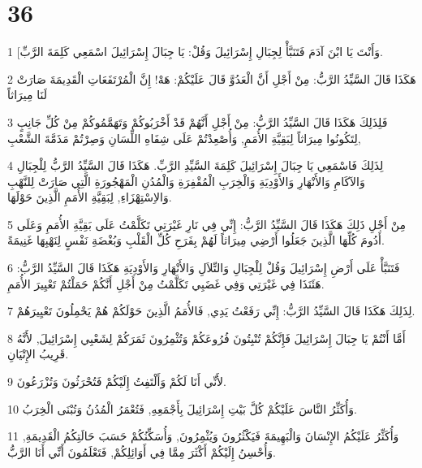 \chapter{36}

\par 1 [وَأَنْتَ يَا ابْنَ آدَمَ فَتَنَبَّأْ لِجِبَالِ إِسْرَائِيلَ وَقُلْ: يَا جِبَالَ إِسْرَائِيلَ اسْمَعِي كَلِمَةَ الرَّبِّ.
\par 2 هَكَذَا قَالَ السَّيِّدُ الرَّبُّ: مِنْ أَجْلِ أَنَّ الْعَدُوَّ قَالَ عَلَيْكُمْ: هَهْ! إِنَّ الْمُرْتَفَعَاتِ الْقَدِيمَةَ صَارَتْ لَنَا مِيرَاثاً
\par 3 فَلِذَلِكَ هَكَذَا قَالَ السَّيِّدُ الرَّبُّ: مِنْ أَجْلِ أَنَّهُمْ قَدْ أَخْرَبُوكُمْ وَتَهَمَّمُوكُمْ مِنْ كُلِّ جَانِبٍ لِتَكُونُوا مِيرَاثاً لِبَقِيَّةِ الأُمَمِ, وَأُصْعِدْتُمْ عَلَى شِفَاهِ اللِّسَانِ وَصِرْتُمْ مَذَمَّةَ الشَّعْبِ,
\par 4 لِذَلِكَ فَاسْمَعِي يَا جِبَالَ إِسْرَائِيلَ كَلِمَةَ السَّيِّدِ الرَّبِّ. هَكَذَا قَالَ السَّيِّدُ الرَّبُّ لِلْجِبَالِ وَالآكَامِ وَالأَنْهَارِ وَالأَوْدِيَةِ وَالْخِرَبِ الْمُقْفِرَةِ وَالْمُدُنِ الْمَهْجُورَةِ الَّتِي صَارَتْ لِلنَّهْبِ وَالاِسْتِهْزَاءِ, لِبَقِيَّةِ الأُمَمِ الَّذِينَ حَوْلَهَا.
\par 5 مِنْ أَجْلِ ذَلِكَ هَكَذَا قَالَ السَّيِّدُ الرَّبُّ: إِنِّي فِي نَارِ غَيْرَتِي تَكَلَّمْتُ عَلَى بَقِيَّةِ الأُمَمِ وَعَلَى أَدُومَ كُلِّهَا الَّذِينَ جَعَلُوا أَرْضِي مِيرَاثاً لَهُمْ بِفَرَحِ كُلِّ الْقَلْبِ وَبُغْضَةِ نَفْسٍ لِنَهْبِهَا غَنِيمَةً.
\par 6 فَتَنَبَّأْ عَلَى أَرْضِ إِسْرَائِيلَ وَقُلْ لِلْجِبَالِ وَالتِّلاَلِ وَالأَنْهَارِ وَالأَوْدِيَةِ هَكَذَا قَالَ السَّيِّدُ الرَّبُّ: هَئَنَذَا فِي غَيْرَتِي وَفِي غَضَبِي تَكَلَّمْتُ مِنْ أَجْلِ أَنَّكُمْ حَمَلْتُمْ تَعْيِيرَ الأُمَمِ.
\par 7 لِذَلِكَ هَكَذَا قَالَ السَّيِّدُ الرَّبُّ: إِنِّي رَفَعْتُ يَدِي, فَالأُمَمُ الَّذِينَ حَوْلَكُمْ هُمْ يَحْمِلُونَ تَعْيِيرَهُمْ.
\par 8 أَمَّا أَنْتُمْ يَا جِبَالَ إِسْرَائِيلَ فَإِنَّكُمْ تُنْبِتُونَ فُرُوعَكُمْ وَتُثْمِرُونَ ثَمَرَكُمْ لِشَعْبِي إِسْرَائِيلَ, لأَنَّهُ قَرِيبُ الإِتْيَانِ.
\par 9 لأَنِّي أَنَا لَكُمْ وَأَلْتَفِتُ إِلَيْكُمْ فَتُحْرَثُونَ وَتُزْرَعُونَ.
\par 10 وَأُكَثِّرُ النَّاسَ عَلَيْكُمْ كُلَّ بَيْتِ إِسْرَائِيلَ بِأَجْمَعِهِ, فَتُعْمَرُ الْمُدُنُ وَتُبْنَى الْخِرَبُ.
\par 11 وَأُكَثِّرُ عَلَيْكُمُ الإِنْسَانَ وَالْبَهِيمَةَ فَيَكْثُرُونَ وَيُثْمِرُونَ, وَأُسَكِّنُكُمْ حَسَبَ حَالَتِكُمُ الْقَدِيمَةِ, وَأُحْسِنُ إِلَيْكُمْ أَكْثَرَ مِمَّا فِي أَوَائِلِكُمْ, فَتَعْلَمُونَ أَنِّي أَنَا الرَّبُّ.
